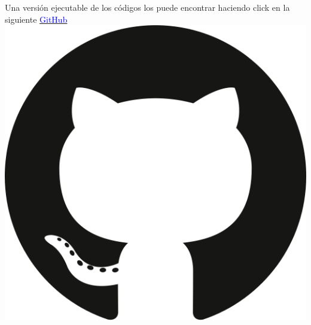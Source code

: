 

    
    \begin{center}
    Una versión ejecutable de los códigos los puede encontrar haciendo click en la siguiente \href{https://github.com/Fabimath/Simulaci-n-Estoc-stica}{ \textcolor{blue}{GitHub}
\includegraphics[scale=0.03]{logo.png}
}
\end{center}
    
